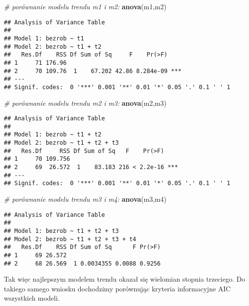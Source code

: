 \documentclass[polish,]{book}
\newenvironment{Shaded}{\begin{snugshade}}{\end{snugshade}}
\newcommand{\CommentTok}[1]{\textcolor[rgb]{0.56,0.35,0.01}{\textit{#1}}}
\newcommand{\KeywordTok}[1]{\textcolor[rgb]{0.13,0.29,0.53}{\textbf{#1}}}
\newcommand{\NormalTok}[1]{#1}
\begin{document}
\begin{Shaded}
\begin{Highlighting}[]
\CommentTok{# porównanie modelu trendu m1 i m2:}
\KeywordTok{anova}\NormalTok{(m1,m2)}
\end{Highlighting}
\end{Shaded}

\begin{verbatim}
## Analysis of Variance Table
## 
## Model 1: bezrob ~ t1
## Model 2: bezrob ~ t1 + t2
##   Res.Df    RSS Df Sum of Sq     F    Pr(>F)    
## 1     71 176.96                                 
## 2     70 109.76  1    67.202 42.86 8.284e-09 ***
## ---
## Signif. codes:  0 '***' 0.001 '**' 0.01 '*' 0.05 '.' 0.1 ' ' 1
\end{verbatim}

\begin{Shaded}
\begin{Highlighting}[]
\CommentTok{# porównanie modelu trendu m2 i m3:}
\KeywordTok{anova}\NormalTok{(m2,m3)}
\end{Highlighting}
\end{Shaded}

\begin{verbatim}
## Analysis of Variance Table
## 
## Model 1: bezrob ~ t1 + t2
## Model 2: bezrob ~ t1 + t2 + t3
##   Res.Df     RSS Df Sum of Sq   F    Pr(>F)    
## 1     70 109.756                               
## 2     69  26.572  1    83.183 216 < 2.2e-16 ***
## ---
## Signif. codes:  0 '***' 0.001 '**' 0.01 '*' 0.05 '.' 0.1 ' ' 1
\end{verbatim}

\begin{Shaded}
\begin{Highlighting}[]
\CommentTok{# porównanie modelu trendu m3 i m4:}
\KeywordTok{anova}\NormalTok{(m3,m4)}
\end{Highlighting}
\end{Shaded}

\begin{verbatim}
## Analysis of Variance Table
## 
## Model 1: bezrob ~ t1 + t2 + t3
## Model 2: bezrob ~ t1 + t2 + t3 + t4
##   Res.Df    RSS Df Sum of Sq      F Pr(>F)
## 1     69 26.572                           
## 2     68 26.569  1 0.0034355 0.0088 0.9256
\end{verbatim}

Tak więc najlepszym modelem trendu okazał się wielomian stopnia trzeciego. Do
takiego samego wniosku dochodzimy porównując kryteria informacyjne AIC wszystkich modeli.
\end{document}
